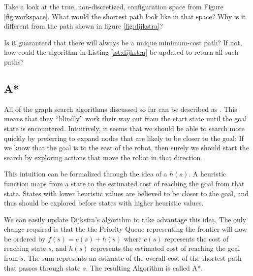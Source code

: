 \begin{exercise}
Take a look at the true, non-discretized, configuration space from
Figure \ref{fig:workspace}.  What would the shortest path look like in
that space?  Why is it different from the path shown in figure
\ref{fig:dijkstra}?
\end{exercise}

\begin{exercise}
Is it guaranteed that there will always be a unique minimum-cost path?
If not, how could the algorithm in Listing \ref{lst:dijkstra} be
updated to return all such paths?
\end{exercise}






\subsection{A*}

All of the graph search algorithms discussed so far can be described
as . This means that they ``blindly'' work their
way out from the start state until the goal state is encountered.
Intuitively, it seems that we should be able to search more quickly by
preferring to expand nodes that are likely to be closer to the goal:
If we know that the goal is to the east of the robot, then
surely we should start the search by exploring actions that move the
robot in that direction.

This intuition can be formalized through the idea of a
 $h(s)$.  A heuristic function maps from a
state to the estimated cost of reaching the goal from that state.
States with lower heuristic values are believed to be closer to the
goal, and thus should be explored before states with higher heuristic
values.

We can easily update Dijkstra's algorithm to take advantage this idea.
The only change required is that the the Priority Queue representing
the frontier will now be ordered by $f(s) = c(s) + h(s)$ where $c(s)$
represents the cost of reaching state $s$, and $h(s)$ represents the
estimated cost of reaching the goal from $s$.  The sum
represents an estimate of the overall cost of the shortest path that
passes through state $s$. The resulting Algorithm is called A*.

